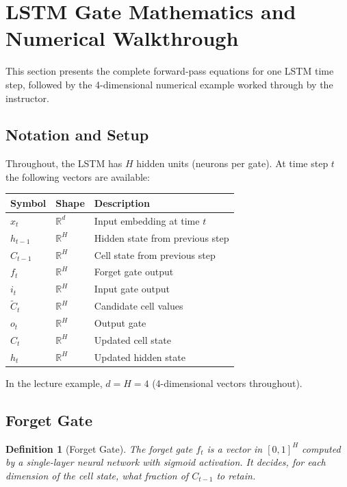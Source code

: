 \documentclass[12pt,a4paper]{article}
\newtheorem{definition}{Definition}[section]
\newcommand{\R}{\mathbb{R}}
\begin{document}
\section{LSTM Gate Mathematics and Numerical Walkthrough}
\label{sec:gates}

This section presents the complete forward-pass equations for one LSTM time
step, followed by the 4-dimensional numerical example worked through by the
instructor.

\subsection{Notation and Setup}
\label{subsec:notation}

Throughout, the LSTM has $H$ hidden units (neurons per gate).  At time step
$t$ the following vectors are available:

\begin{center}
\begin{tabular}{lll}
\toprule
\textbf{Symbol} & \textbf{Shape} & \textbf{Description} \\
\midrule
$x_t$     & $\R^d$  & Input embedding at time $t$ \\
$h_{t-1}$ & $\R^H$  & Hidden state from previous step \\
$C_{t-1}$ & $\R^H$  & Cell state from previous step \\
$f_t$     & $\R^H$  & Forget gate output \\
$i_t$     & $\R^H$  & Input gate output \\
$\tilde{C}_t$ & $\R^H$ & Candidate cell values \\
$o_t$     & $\R^H$  & Output gate \\
$C_t$     & $\R^H$  & Updated cell state \\
$h_t$     & $\R^H$  & Updated hidden state \\
\bottomrule
\end{tabular}
\end{center}

In the lecture example, $d = H = 4$ (4-dimensional vectors throughout).

\subsection{Forget Gate}
\label{subsec:forget-gate}

\begin{definition}[Forget Gate]
  The forget gate $f_t$ is a vector in $[0,1]^H$ computed by a single-layer
  neural network with sigmoid activation.  It decides, for each dimension of
  the cell state, what fraction of $C_{t-1}$ to \emph{retain}.
\end{definition}
\end{document}
